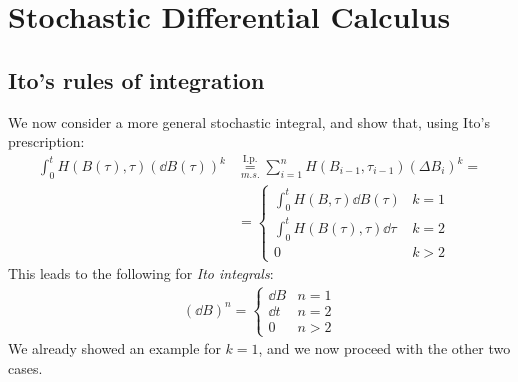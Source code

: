 \documentclass[../template.tex]{subfiles}
\begin{document}
\section{Stochastic Differential Calculus}

\begin{comment}
We want now to generalize the ordinary calculus rules to the stochastic case.\\
We obtained a stochastic differential equation from the Master Equation. Then, to understand the underlying physics, we introduced the \textit{Langenvin equation} (in the Overdamped limit):
\begin{align*}
    \dd{x(t)} = f(x(t),t) \dd{t} + \sqrt{2D(x(t),t)} \dd{B(t)}
\end{align*} 
with $f = F_{\mathrm{ext} }/\gamma$.

The meaning of $\dd{B(t)}$ is clear only passing to \textit{finite differences}, where $\dd{B} \to \Delta B$ is distributed according to: 
\begin{align*}
    \Delta B \frac{1}{\sqrt{2 \pi \Delta t}} \sim \exp\left(-\frac{(\Delta B)^2}{2 \Delta t} \right)
\end{align*}  
If we consider a \textit{stochastic integral}:
\begin{align*}
    \int g \dd{B}
\end{align*} 
we need to discretize it and take the continuum limit (in the mean square convergence).
\end{comment}

\subsection{Ito's rules of integration}
We now consider a more general stochastic integral, and show that, using Ito's prescription:
\begin{align*}
    \int_0^t H(B(\tau), \tau) (\dd{B(\tau)})^k &\underset{m.s.}{\overset{\mathrm{I.p.}}{=} } \sum_{i=1}^n H(B_{i-1}, \tau_{i-1}) (\Delta B_i)^k =\\
    &= \begin{cases}
        \int_0^t H(B, \tau) \dd{B(\tau)} & k=1\\
        \int_0^t H(B(\tau), \tau) \dd{\tau} & k=2\\
        0 & k > 2
    \end{cases}
\end{align*}
This leads to the following  for \textit{Ito integrals}:  
\begin{align}
    (\dd{B})^n = \begin{cases}
        \dd{B} & n=1\\
        \dd{t} & n=2\\
        0 & n>2
    \end{cases}\label{eqn:Ito-rules}
\end{align} 
We already showed an example for $k=1$, and we now proceed with the other two cases.
\end{document}
